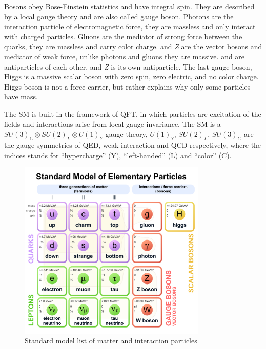 Bosons obey Bose-Einstein statistics and have integral spin.
They are described by a local gauge theory and are also called gauge boson.
Photons are the interaction particle of electromagnetic force, they are massless
and only interact with charged particles. Gluons are the mediator of strong force
between the quarks, they are massless and carry color charge. \Wplusminus{} and \textit{Z}
are the vector bosons and mediator of weak force,
unlike photons and gluons they are massive. \Wplus{} and \Wminus{}
are antiparticles of each other, and \textit{Z} is its own antiparticle.
The last gauge boson, Higgs is a massive scalar boson with zero spin,
zero electric, and no color charge. Higgs boson is not a force carrier,
but rather explains why only some particles have mass.

The \gls{SM} is built in the framework of \gls{QFT}, in which particles
are excitation of the fields and interactions arise from local gauge
invariance. The \gls{SM} is a \( {SU(3)}_C \otimes {SU(2)}_L \otimes {U(1)}_Y\)
gauge theory, \( {U(1)}_Y \), \( {SU(2)}_L \), \( {SU(3)}_C \) are the gauge symmetries
of \gls{QED}, weak interaction and \gls{QCD} respectively, where the indices
stands for ``hypercharge'' (Y), ``left-handed'' (L) and ``color'' (C).

\begin{figure}[!ht]
  \centering
  \includegraphics[width=0.8\textwidth]{figures/Standard_Model_of_Elementary_Particles.pdf}
  \caption[Standard model list of matter and interaction particles]%
  {Standard model list of matter and interaction particles~\cite{image-standard-model}}%
  \label{fig:standard-model-details}
\end{figure}

